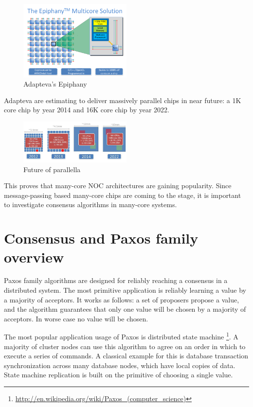 \documentclass[english,11pt]{l4proj}
\begin{document}
\begin{figure}
    \centering
    \includegraphics[width=0.5\textwidth]{images/parallella_64core.png}
    \caption{Adapteva's Epiphany\cite{parallella-kickstarter}}
    \label{fig:epiphany_64}
\end{figure}

Adapteva are estimating to deliver massively parallel chips in near future: a 1K
core chip by year 2014 and 16K core chip by year 2022.

\begin{figure}
    \centering
    \includegraphics[width=0.5\textwidth]{images/parallella_future.jpg}
    \caption{Future of parallella\cite{parallella-kickstarter}}
    \label{fig:parallella_future}
\end{figure}

This proves that many-core NOC architectures are gaining popularity. Since
message-passing based many-core chips are coming to the stage, it is important
to investigate consensus algorithms in many-core systems.

\section{Consensus and Paxos family overview}
\label{sec:paxos-family}

Paxos family algorithms are designed for reliably reaching a consensus in a
distributed system. The most primitive application is reliably learning a value
by a majority of acceptors. It works as follows: a set of proposers propose a
value, and the algorithm guarantees that only one value will be chosen by a
majority of acceptors. In worse case no value will be chosen.

The most popular application usage of Paxos is distributed state machine
\footnote{\url{http://en.wikipedia.org/wiki/Paxos\_(computer\_science)}}. A
majority of cluster nodes can use this algorithm to agree on an order in which
to execute a series of commands. A classical example for this is database
transaction synchronization across many database nodes, which have local copies
of data. State machine replication is built on the primitive of choosing a
single value.
\end{document}
